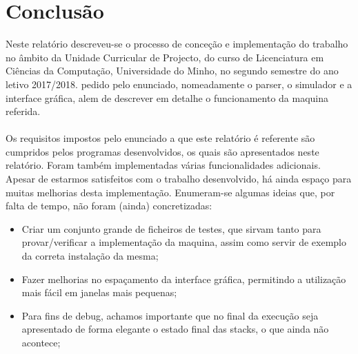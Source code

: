 \documentclass{report}
\begin{document}
\chapter{Conclusão} \label{concl}
\quad Neste relatório descreveu-se o processo de conceção e implementação do trabalho no
âmbito da Unidade Curricular de Projecto, do curso de Licenciatura em Ciências da Computação, Universidade do Minho, no
segundo semestre do ano letivo 2017/2018. pedido pelo
enunciado, nomeadamente o parser, o simulador e a interface gráfica, alem de descrever em detalhe
o funcionamento da maquina referida.\\\\
\null\quad Os requisitos impostos pelo enunciado a que este relatório é referente são cumpridos pelos programas desenvolvidos,
os quais são apresentados neste relatório. Foram também implementadas várias funcionalidades adicionais.\\
\null\quad Apesar de estarmos satisfeitos com o trabalho desenvolvido, há ainda espaço para muitas
melhorias desta implementação. Enumeram-se algumas ideias que, por falta de tempo, não foram
(ainda) concretizadas:

\begin{itemize}
\item Criar um conjunto grande de ficheiros de testes, que sirvam tanto para provar/verificar a
implementação da maquina, assim como servir de exemplo da correta instalação da mesma;
\item Fazer melhorias no espaçamento da interface gráfica, permitindo a utilização mais fácil em janelas mais pequenas;
\item Para fins de debug, achamos importante que no final da execução seja apresentado de forma elegante o estado final das stacks,
o que ainda não acontece;
\end{itemize}

%
%
\end{document}
